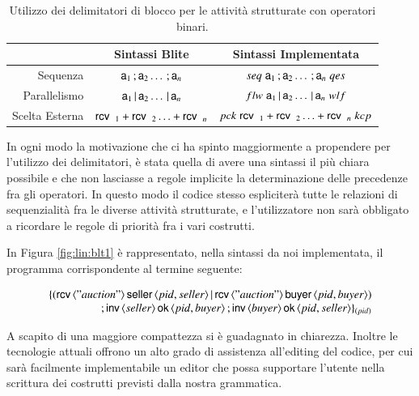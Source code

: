\begin{table}
\begin{center}
\begin{tabular}{|r|c|c|}
\hline
 & Sintassi Blite & Sintassi Implementata \\
\hline
Sequenza & ${\sf a}_1 \, ; {\sf a}_2 \ldots \, ; {\sf a}_n $ & $seq \; {\sf a}_1 \, ;
{\sf a}_2 \ldots \, ; {\sf a}_n \; qes$ \\
\hline
Parallelismo & ${\sf a}_1 \,|\, {\sf a}_2 \ldots \,|\, {\sf a}_n $ & $flw \; {\sf a}_1 \,|\,
{\sf a}_2 \ldots \,|\, {\sf a}_n \; wlf$ \\
\hline
Scelta Esterna & ${\sf rcv}\,\, \,_1 + {\sf rcv}\,\, \,_2
\ldots + {\sf rcv}\,\, \,_n $ & $pck \; {\sf rcv}\,\, \,_1 + 
{\sf rcv}\,\, \,_2 \ldots + {\sf rcv}\,\, \,_n \; kcp$ \\
\hline
\end{tabular}
\caption[Delimitatori di blocco per le attività strutturate]{Utilizzo dei
delimitatori di blocco per le attività strutturate con operatori binari.}
\label{tab:blokmarks}
\end{center}
\end{table}

In ogni modo la motivazione che ci ha spinto maggiormente a propendere per
l'utilizzo dei delimitatori, è stata quella di avere una sintassi il più chiara
possibile e che non lasciasse a regole implicite la determinazione delle
precedenze fra gli operatori. In questo modo il codice stesso espliciterà tutte le
relazioni di sequenzialità fra le diverse attività strutturate, e l'utilizzatore non sarà
obbligato a ricordare le regole di priorità fra i vari costrutti.

In Figura \ref{fig:lin:blt1} è rappresentato, nella sintassi
da noi implementata, il programma corrispondente al termine seguente:

$$
\begin{array}{rl}
\{ 
(
	{\sf rcv}\,\langle "auction" \rangle \, {\sf seller}\, \langle pid, seller \rangle
	\,|\,
	{\sf rcv}\,\langle "auction" \rangle \, {\sf buyer}\, \langle pid, buyer \rangle 
)
\\
\, ; 
{\sf inv}\,\langle seller \rangle \,{\sf ok}\,\langle pid, buyer \rangle
\, ;
{\sf inv}\,\langle buyer \rangle \,{\sf ok}\,\langle pid, seller \rangle
 \}_{(pid)}
\end{array}
$$

A scapito di una maggiore compattezza si è guadagnato in chiarezza. Inoltre
le tecnologie attuali offrono un alto grado di assistenza all'editing del
codice, per cui sarà facilmente implementabile un editor che possa supportare
l'utente nella scrittura dei costrutti previsti dalla nostra grammatica.
\\

